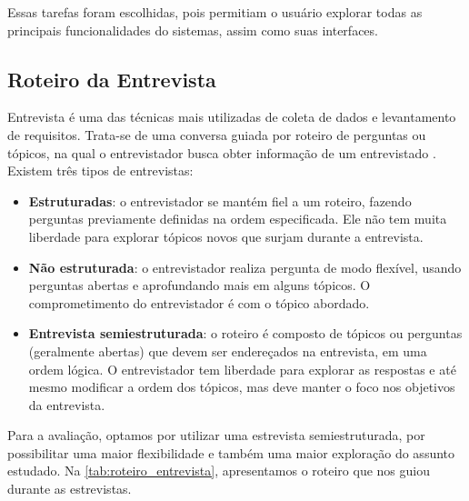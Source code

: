 Essas tarefas foram escolhidas, pois permitiam o usuário explorar todas as principais funcionalidades do sistemas, assim como suas interfaces. 

\subsection{Roteiro da Entrevista}
Entrevista é uma das técnicas mais utilizadas de coleta de dados e levantamento de requisitos. Trata-se de uma conversa guiada por roteiro de perguntas ou tópicos, na qual o entrevistador busca obter informação de um entrevistado \cite{seidman1998interview}. Existem três tipos de entrevistas:
\begin{itemize}
	\item \textbf{Estruturadas}: o entrevistador se mantém fiel a um roteiro, fazendo perguntas previamente definidas na ordem especificada. Ele não tem muita liberdade para explorar tópicos novos que surjam durante a entrevista.
	\item \textbf{Não estruturada}:  o entrevistador realiza pergunta de modo flexível, usando perguntas abertas e aprofundando mais em alguns tópicos. O comprometimento do entrevistador é com o tópico abordado.
	\item \textbf{Entrevista semiestruturada}: o roteiro é composto de tópicos ou perguntas (geralmente abertas) que devem ser endereçados na entrevista, em uma ordem lógica. O entrevistador tem liberdade para explorar as respostas e até mesmo modificar a ordem dos tópicos, mas deve manter o foco nos objetivos da entrevista. 
\end{itemize}

Para a avaliação, optamos por utilizar uma estrevista semiestruturada,  por possibilitar uma maior flexibilidade e também uma maior exploração do assunto estudado. Na \autoref{tab:roteiro_entrevista}, apresentamos o roteiro que nos guiou durante as estrevistas.


